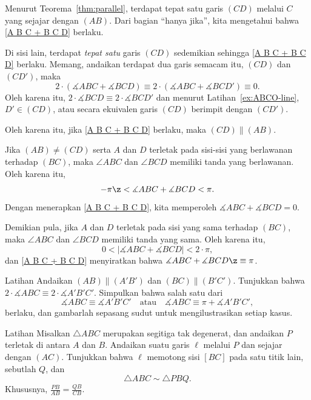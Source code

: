 Menurut Teorema~\ref{thm:parallel}, terdapat tepat satu garis $(CD)$ melalui $C$ yang sejajar dengan $(AB)$.
Dari bagian ``hanya jika'', kita mengetahui bahwa \ref{A B C + B C D} berlaku.

Di sisi lain, terdapat \textit{tepat satu} garis $(CD)$ sedemikian sehingga \ref{A B C + B C D} berlaku.
Memang, andaikan terdapat dua garis semacam itu, $(CD)$ dan $(CD')$, maka
$$2\cdot(\measuredangle A B C+\measuredangle B C D)\equiv 2\cdot(\measuredangle A B C+\measuredangle B C D')\equiv0.
$$
Oleh karena itu,
$2\cdot\measuredangle B C D\equiv 2\cdot\measuredangle B C D'$
dan menurut Latihan~\ref{ex:ABCO-line}, $D'\in (CD)$, atau secara ekuivalen garis $(CD)$ berimpit dengan $(CD')$.

Oleh karena itu, jika \ref{A B C + B C D} berlaku, maka $(CD)\parallel (AB)$.


Jika $(AB)\ne(C D)$ serta $A$ dan $D$ terletak pada sisi-sisi yang berlawanan terhadap $(BC)$, maka $\angle ABC$ dan $\angle BCD$ memiliki tanda yang berlawanan.
Oleh karena itu,
\[-\pi\z<\measuredangle A B C+\measuredangle B C D<\pi.\]
Dengan menerapkan \ref{A B C + B C D}, kita memperoleh $\measuredangle A B C+\measuredangle B C D=0$.

Demikian pula, jika $A$ dan $D$ terletak pada sisi yang sama terhadap $(BC)$,
maka $\angle ABC$ dan $\angle BCD$ memiliki tanda yang sama.
Oleh karena itu,
\[0<|\measuredangle A B C+\measuredangle B C D|<2\cdot\pi,\]
dan \ref{A B C + B C D} menyiratkan bahwa $\measuredangle A B C+\measuredangle B C D\z\equiv\pi$.
\qeds

\begin{thm}{Latihan}\label{ex:parallel-angles}
Andaikan $(AB) \parallel (A'B')$ dan $(BC) \parallel (B'C')$.
Tunjukkan bahwa
$2\cdot \measuredangle ABC \equiv 2\cdot \measuredangle A'B'C'$.
Simpulkan bahwa salah satu dari
\[
\measuredangle ABC \equiv \measuredangle A'B'C' \quad \text{atau} \quad \measuredangle ABC \equiv \pi + \measuredangle A'B'C',
\]
berlaku, dan gambarlah sepasang sudut untuk mengilustrasikan setiap kasus.
\end{thm}


\begin{thm}[!]{Latihan}\label{ex:smililar+parallel}
Misalkan $\triangle ABC$ merupakan segitiga tak degenerat, dan andaikan $P$ terletak di antara $A$ dan $B$.
Andaikan suatu garis $\ell$ melalui $P$ dan sejajar dengan $(AC)$.
Tunjukkan bahwa $\ell$ memotong sisi $[BC]$ pada satu titik lain, sebutlah $Q$, dan
\[\triangle ABC\sim\triangle PBQ.\]
Khususnya, $\tfrac{PB}{AB}=\tfrac{QB}{CB}$.
\end{thm}

